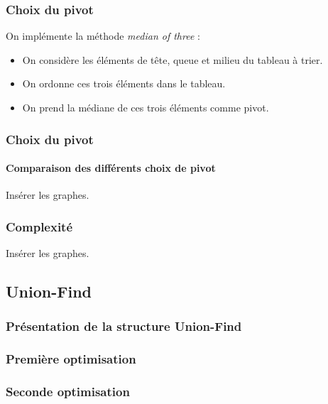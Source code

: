 \documentclass[handout]{beamer}
\begin{document}
			\begin{frame}
				\frametitle{Choix du pivot}

				On implémente la méthode \emph{median of three} : 
				
				\begin{itemize}
					\item On considère les éléments de tête, queue et
						milieu du tableau à trier.
					\item On ordonne ces trois éléments dans le tableau.
					\item On prend la médiane de ces trois éléments comme
						pivot.
				\end{itemize}

			\end{frame}
			\begin{frame}
				\frametitle{Choix du pivot}
				\framesubtitle{Comparaison des différents choix de pivot}

				Insérer les graphes.

			\end{frame}
			\begin{frame}
				\frametitle{Complexité}

				Insérer les graphes.

			\end{frame}
		\subsection{Union-Find}
			\begin{frame}
				\frametitle{Présentation de la structure Union-Find}
		
			\end{frame}
			\begin{frame}
				\frametitle{Première optimisation}

			\end{frame}
			\begin{frame}
				\frametitle{Seconde optimisation}

			\end{frame}
\end{document}
